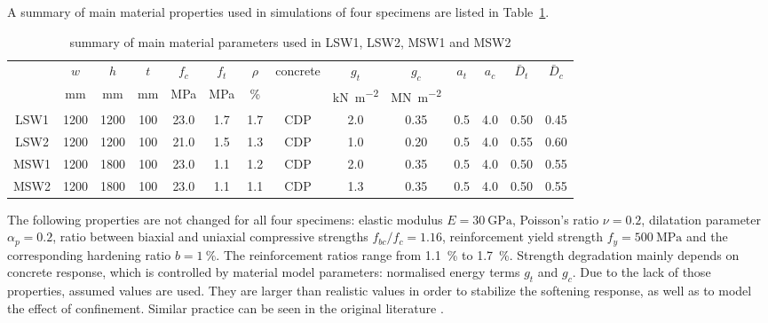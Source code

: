 \documentclass[3p,review,sort&compress,11pt,fleqn]{elsarticle}
\newcommand*{\tabref}[1]{Table~\ref{#1}}
\begin{document}
A summary of main material properties used in simulations of four specimens are listed in \tabref{tab:parameter_summary}.
\begin{table}[htb]
\setlength{\tabcolsep}{5pt}
\scriptsize\centering\caption{summary of main material parameters used in LSW1, LSW2, MSW1 and MSW2}\label{tab:parameter_summary}
\begin{tabular}{cccccccccccccc}
	\toprule
	     &        $w$        &        $h$        &        $t$        &       $f_c$       &       $f_t$       &    $\rho$     & concrete &             $g_t$             &             $g_c$             &   $a_t$   &   $a_c$   & $\bar{D}_t$ & $\bar{D}_c$ \\
	     & \si{\milli\metre} & \si{\milli\metre} & \si{\milli\metre} & \si{\mega\pascal} & \si{\mega\pascal} & \si{\percent} &          & \si{\kilo\newton\per\metre^2} & \si{\mega\newton\per\metre^2} &           &           &             &             \\ \midrule
	LSW1 &       1200        &       1200        &        100        &       23.0        &        1.7        &      1.7      &   CDP    &           \num{2.0}           &          \num{0.35}           & \num{0.5} & \num{4.0} & \num{0.50}  & \num{0.45}  \\
	LSW2 &       1200        &       1200        &        100        &       21.0        &        1.5        &      1.3      &   CDP    &           \num{1.0}           &          \num{0.20}           & \num{0.5} & \num{4.0} & \num{0.55}  & \num{0.60}  \\
	MSW1 &       1200        &       1800        &        100        &       23.0        &        1.1        &      1.2      &   CDP    &           \num{2.0}           &          \num{0.35}           & \num{0.5} & \num{4.0} & \num{0.50}  & \num{0.55}  \\
	MSW2 &       1200        &       1800        &        100        &       23.0        &        1.1        &      1.1      &   CDP    &           \num{1.3}           &          \num{0.35}           & \num{0.5} & \num{4.0} & \num{0.50}  & \num{0.55}  \\ \bottomrule
\end{tabular}
\end{table}
The following properties are not changed for all four specimens: elastic modulus $E=\SI{30}{\giga\pascal}$, Poisson's ratio $\nu=\num{0.2}$, dilatation parameter $\alpha_p=\num{0.2}$, ratio between biaxial and uniaxial compressive strengths $f_{bc}/f_c=\num{1.16}$, reinforcement yield strength $f_y=\SI{500}{\mega\pascal}$ and the corresponding hardening ratio $b=\SI{1}{\percent}$. The reinforcement ratios range from \SI{1.1}{\percent} to \SI{1.7}{\percent}. Strength degradation mainly depends on concrete response, which is controlled by material model parameters: normalised energy terms $g_t$ and $g_c$. Due to the lack of those properties, assumed values are used. They are larger than realistic values in order to stabilize the softening response, as well as to model the effect of confinement. Similar practice can be seen in the original literature \citep{Lee1996}.
\end{document}

